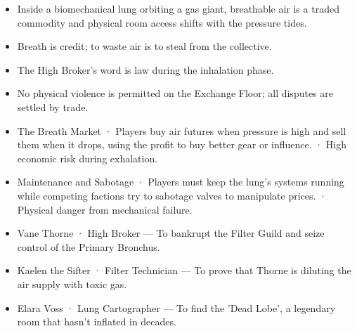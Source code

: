 \documentclass[10pt,a4paper]{article}
\newcommand{\heading}[1]{\par\vspace{5pt}{\color{teal}\bfseries #1}\par}
\begin{document}
\begin{minipage}[t]{0.48\linewidth}\fontsize{9}{12}\selectfont\raggedright\setlength{\parskip}{0pt}
\heading{世界概述}\begin{itemize}
\item Inside a biomechanical lung orbiting a gas giant, breathable air is a traded commodity and physical room access shifts with the pressure tides.
\end{itemize}
\heading{规则与制度}\begin{itemize}
\item Breath is credit; to waste air is to steal from the collective.
\item The High Broker's word is law during the inhalation phase.
\item No physical violence is permitted on the Exchange Floor; all disputes are settled by trade.
\end{itemize}
\heading{活动与压力}\begin{itemize}
\item The Breath Market · Players buy air futures when pressure is high and sell them when it drops, using the profit to buy better gear or influence. · High economic risk during exhalation.
\item Maintenance and Sabotage · Players must keep the lung's systems running while competing factions try to sabotage valves to manipulate prices. · Physical danger from mechanical failure.
\end{itemize}
\heading{人物与目标}\begin{itemize}
\item Vane Thorne · High Broker — To bankrupt the Filter Guild and seize control of the Primary Bronchus.
\item Kaelen the Sifter · Filter Technician — To prove that Thorne is diluting the air supply with toxic gas.
\item Elara Voss · Lung Cartographer — To find the 'Dead Lobe', a legendary room that hasn't inflated in decades.
\end{itemize}
\end{minipage}\hfill
\end{document}
